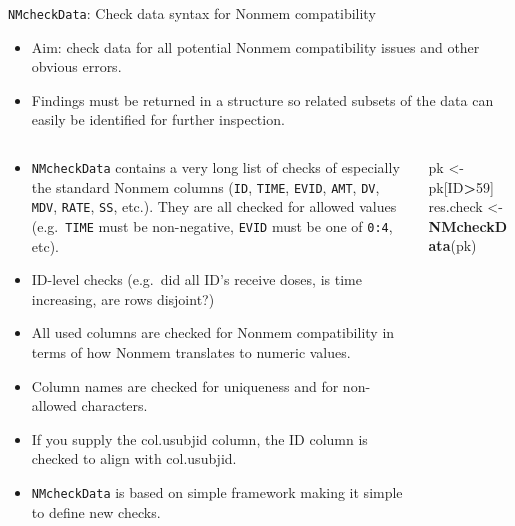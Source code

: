 \documentclass[
  8pt,
  ignorenonframetext,
  aspectratio=169]{beamer}
\newenvironment{Shaded}{\begin{snugshade}}{\end{snugshade}}
\newcommand{\DecValTok}[1]{\textcolor[rgb]{0.00,0.00,0.81}{#1}}
\newcommand{\KeywordTok}[1]{\textcolor[rgb]{0.13,0.29,0.53}{\textbf{#1}}}
\newcommand{\NormalTok}[1]{#1}
\newcommand{\OperatorTok}[1]{\textcolor[rgb]{0.81,0.36,0.00}{\textbf{#1}}}
\newcommand{\StringTok}[1]{\textcolor[rgb]{0.31,0.60,0.02}{#1}}
\begin{document}
\begin{frame}[fragile]{\texttt{NMcheckData}: Check data syntax for
Nonmem compatibility}
\protect\hypertarget{nmcheckdata-check-data-syntax-for-nonmem-compatibility}{}
\begin{itemize}
\item
  Aim: check data for all potential Nonmem compatibility issues and
  other obvious errors.
\item
  Findings must be returned in a structure so related subsets of the
  data can easily be identified for further inspection.
\end{itemize}

\begin{columns}[T]
\begin{column}{0.48\textwidth}
\begin{itemize}
\item
  \texttt{NMcheckData} contains a very long list of checks of especially
  the standard Nonmem columns (\texttt{ID}, \texttt{TIME},
  \texttt{EVID}, \texttt{AMT}, \texttt{DV}, \texttt{MDV}, \texttt{RATE},
  \texttt{SS}, etc.). They are all checked for allowed values
  (e.g.~\texttt{TIME} must be non-negative, \texttt{EVID} must be one of
  \texttt{0:4}, etc).
\item
  ID-level checks (e.g.~did all ID's receive doses, is time increasing,
  are rows disjoint?)
\item
  All used columns are checked for Nonmem compatibility in terms of how
  Nonmem translates to numeric values.
\item
  Column names are checked for uniqueness and for non-allowed
  characters.
\item
  If you supply the col.usubjid column, the ID column is checked to
  align with col.usubjid.
\item
  \texttt{NMcheckData} is based on simple framework making it simple to
  define new checks.
\end{itemize}
\end{column}

\begin{column}{0.48\textwidth}
\scriptsize

\begin{Shaded}
\begin{Highlighting}[]
\NormalTok{pk \textless{}{-}}\StringTok{ }\NormalTok{pk[ID}\OperatorTok{\textgreater{}}\DecValTok{59}\NormalTok{]}
\NormalTok{res.check \textless{}{-}}\StringTok{ }\KeywordTok{NMcheckData}\NormalTok{(pk)}
\end{Highlighting}
\end{Shaded}


\end{column}
\end{columns}
\end{frame}
\end{document}
